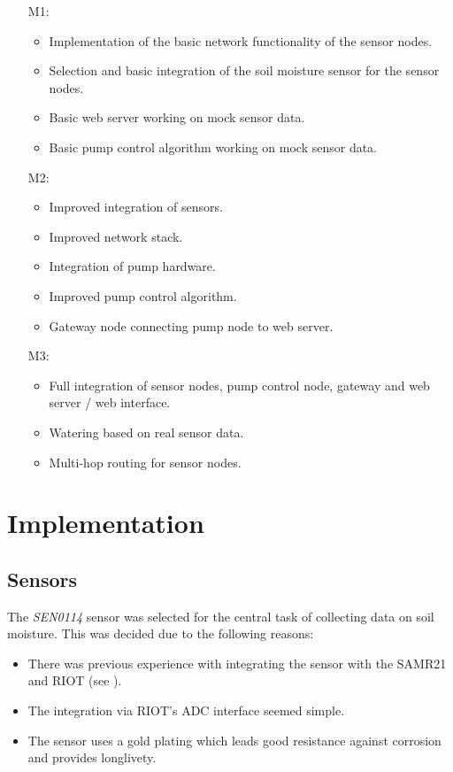\documentclass[11pt,paper=a4,parskip=half]{scrartcl}
\begin{document}
  \begin{itemize}
    \item[M1:]
      \begin{itemize}
	\item Implementation of the basic network functionality of the sensor
		nodes.
	\item Selection and basic integration of the soil moisture sensor for
		the sensor nodes.
	\item Basic web server working on mock sensor data.
	\item Basic pump control algorithm working on mock sensor data.
      \end{itemize}
    \item[M2:]
      \begin{itemize}
	\item Improved integration of sensors.
	\item Improved network stack.
	\item Integration of pump hardware.
	\item Improved pump control algorithm.
	\item Gateway node connecting pump node to web server.
      \end{itemize}
    \item[M3:]
      \begin{itemize}
	\item Full integration of sensor nodes, pump control node, gateway and
		web server / web interface.
	\item Watering based on real sensor data.
	\item Multi-hop routing for sensor nodes.
      \end{itemize}
  \end{itemize}


\section{Implementation}

\subsection{Sensors}
\label{sec:sensors}
  The \textit{SEN0114} \cite{SEN} sensor was selected for the central task of collecting
  data on soil moisture. This was decided due to the following reasons:

  \begin{itemize}
    \item There was previous experience with integrating the sensor with the
	    SAMR21 and RIOT (see \cite{watrli}).
    \item The integration via RIOT's ADC interface \cite{riot_adc} seemed
	    simple.
    \item The sensor uses a gold plating which leads good resistance against
	    corrosion and provides longlivety.
  \end{itemize}
\end{document}
